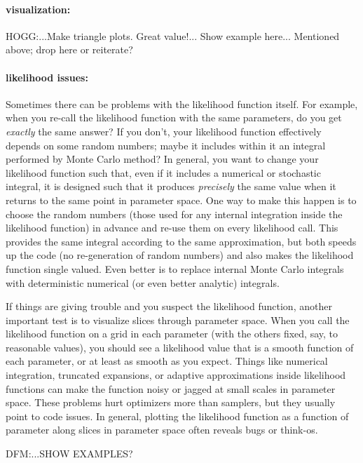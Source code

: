 \documentclass[12pt,twoside,pdftex]{article}
\begin{document}
\paragraph{visualization:}
HOGG:...Make triangle plots.  Great value!...  Show example here... Mentioned above; drop here or reiterate?

\paragraph{likelihood issues:}
Sometimes there can be problems with the likelihood function itself.
For example,
  when you re-call the likelihood function with the same parameters,
  do you get \emph{exactly} the same answer?
If you don't, your likelihood function effectively depends on some random numbers;
  maybe it includes within it an integral performed by Monte Carlo method?
In general, you want to change your likelihood function such that,
  even if it includes a numerical or stochastic integral,
  it is designed such that it produces \emph{precisely} the same
  value when it returns to the same point in parameter space.
One way to make this happen is to choose the random numbers
  (those used for any internal integration inside the likelihood function)
  in advance and re-use them on every likelihood call.
This provides the same integral according to the same approximation,
  but both speeds up the code (no re-generation of random numbers)
  and also makes the likelihood function single valued.
Even better is to replace internal Monte Carlo integrals with
  deterministic numerical (or even better analytic) integrals.

If things are giving trouble and you suspect the likelihood function,
  another important test is to visualize slices through parameter space.
When you call the likelihood function on a grid in each parameter
  (with the others fixed, say, to reasonable values),
  you should see a likelihood value that is a smooth function of each parameter,
  or at least as smooth as you expect.
Things like numerical integration,
  truncated expansions,
  or adaptive approximations
  inside likelihood functions
  can make the function noisy or jagged at small scales in parameter space.
These problems hurt optimizers more than samplers,
  but they usually point to code issues.
In general, plotting the likelihood function as a function of parameter along
  slices in parameter space often reveals bugs or think-os.

DFM:...SHOW EXAMPLES?
\end{document}
